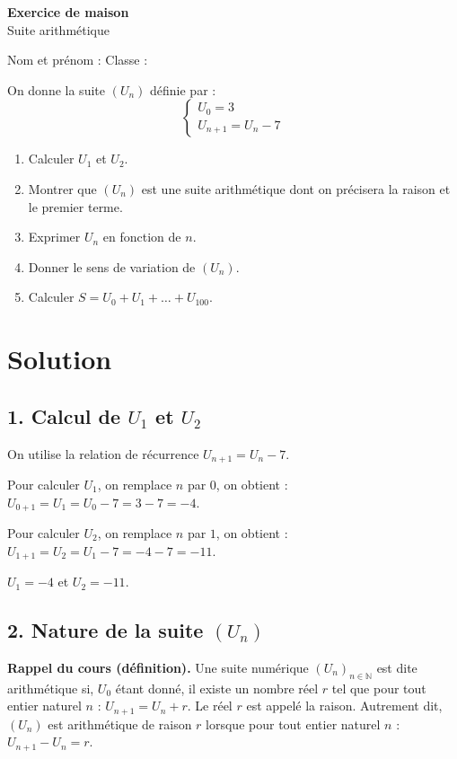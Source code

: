 \documentclass[12pt,a4paper]{article}
\begin{document}
\begin{center}
{\LARGE\bfseries Exercice de maison}\\[4pt]
{\large Suite arithmétique}
\end{center}

\vspace{4pt}
\noindent Nom et prénom : \dotfill \quad Classe : \dotfill

\vspace{6pt}
\begin{tcolorbox}[colback=white,colframe=black,boxrule=0.5pt,arc=1pt,title=\textbf{Énoncé},
  coltitle=black,colbacktitle=gray!15]
On donne la suite $(U_n)$ définie par :
\[
\begin{cases}
U_0 = 3\\
U_{n+1} = U_n - 7
\end{cases}
\]
\begin{enumerate}[nosep]
  \item Calculer $U_1$ et $U_2$.
  \item Montrer que $(U_n)$ est une suite arithmétique dont on précisera la raison et le premier terme.
  \item Exprimer $U_n$ en fonction de $n$.
  \item Donner le sens de variation de $(U_n)$.
  \item Calculer $S = U_0 + U_1 + \dots + U_{100}$.
\end{enumerate}
\end{tcolorbox}

\section*{Solution}

\subsection*{1. Calcul de $U_1$ et $U_2$}
On utilise la relation de récurrence $U_{n+1} = U_n - 7$.

Pour calculer $U_1$, on remplace $n$ par $0$, on obtient :
\quad $U_{0+1} = U_1 = U_0 - 7 = 3 - 7 = -4$.

Pour calculer $U_2$, on remplace $n$ par $1$, on obtient :
\quad $U_{1+1} = U_2 = U_1 - 7 = -4 - 7 = -11$.

\begin{resultat}
$U_1 = -4$ \qquad et \qquad $U_2 = -11$.
\end{resultat}

\subsection*{2. Nature de la suite $(U_n)$}
\textbf{Rappel du cours (définition).} Une suite numérique $(U_n)_{n\in\mathbb{N}}$ est dite arithmétique
si, $U_0$ étant donné, il existe un nombre réel $r$ tel que pour tout entier naturel $n$ :
$U_{n+1} = U_n + r$. Le réel $r$ est appelé la raison. Autrement dit, $(U_n)$ est arithmétique de
raison $r$ lorsque pour tout entier naturel $n$ : $U_{n+1} - U_n = r$.
\end{document}
